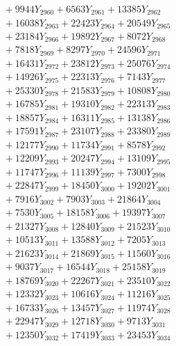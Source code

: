 \documentclass[a4paper,10pt]{article}
\begin{document}
{\begin{align}
&\;  + 9944 Y_{2960} + 6563 Y_{2961} + 13385 Y_{2962} \\[0.3ex]
&\;  + 16038 Y_{2963} + 22423 Y_{2964} + 20549 Y_{2965} \\[0.3ex]
&\;  + 23184 Y_{2966} + 19892 Y_{2967} + 8072 Y_{2968} \\[0.5ex]\allowbreak
&\;  + 7818 Y_{2969} + 8297 Y_{2970} + 24596 Y_{2971} \\[0.3ex]
&\;  + 16431 Y_{2972} + 23812 Y_{2973} + 25076 Y_{2974} \\[0.3ex]
&\;  + 14926 Y_{2975} + 22313 Y_{2976} + 7143 Y_{2977} \\[0.3ex]
&\;  + 25330 Y_{2978} + 21583 Y_{2979} + 10808 Y_{2980} \\[0.3ex]
&\;  + 16785 Y_{2981} + 19310 Y_{2982} + 22313 Y_{2983} \\[0.3ex]
&\;  + 18857 Y_{2984} + 16311 Y_{2985} + 13138 Y_{2986} \\[0.3ex]
&\;  + 17591 Y_{2987} + 23107 Y_{2988} + 23380 Y_{2989} \\[0.3ex]
&\;  + 12177 Y_{2990} + 11734 Y_{2991} + 8578 Y_{2992} \\[0.3ex]
&\;  + 12209 Y_{2993} + 20247 Y_{2994} + 13109 Y_{2995} \\[0.3ex]
&\;  + 11747 Y_{2996} + 11139 Y_{2997} + 7300 Y_{2998} \\[0.5ex]\allowbreak
&\;  + 22847 Y_{2999} + 18450 Y_{3000} + 19202 Y_{3001} \\[0.3ex]
&\;  + 7916 Y_{3002} + 7903 Y_{3003} + 21864 Y_{3004} \\[0.3ex]
&\;  + 7530 Y_{3005} + 18158 Y_{3006} + 19397 Y_{3007} \\[0.3ex]
&\;  + 21327 Y_{3008} + 12840 Y_{3009} + 21523 Y_{3010} \\[0.3ex]
&\;  + 10513 Y_{3011} + 13588 Y_{3012} + 7205 Y_{3013} \\[0.3ex]
&\;  + 21623 Y_{3014} + 21869 Y_{3015} + 11560 Y_{3016} \\[0.3ex]
&\;  + 9037 Y_{3017} + 16544 Y_{3018} + 25158 Y_{3019} \\[0.3ex]
&\;  + 18769 Y_{3020} + 22267 Y_{3021} + 23510 Y_{3022} \\[0.3ex]
&\;  + 12332 Y_{3023} + 10616 Y_{3024} + 11216 Y_{3025} \\[0.3ex]
&\;  + 16733 Y_{3026} + 13457 Y_{3027} + 11974 Y_{3028} \\[0.5ex]\allowbreak
&\;  + 22947 Y_{3029} + 12718 Y_{3030} + 9713 Y_{3031} \\[0.3ex]
&\;  + 12350 Y_{3032} + 17419 Y_{3033} + 23453 Y_{3034} \\[0.3ex]

\end{align}}
\end{document}
